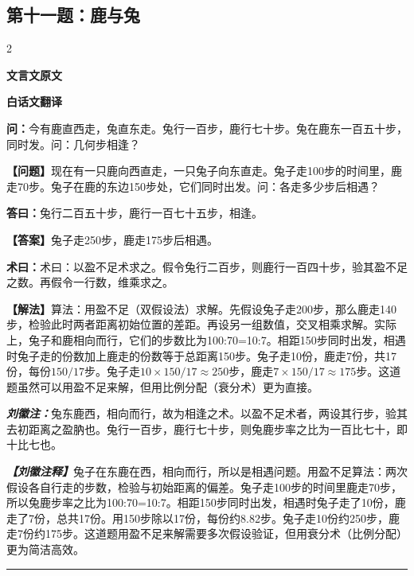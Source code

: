 \documentclass[10pt,a4paper]{article}
\newcommand{\wen}[1]{\textbf{\color{problemcolor}问：}#1\par}
\newcommand{\da}[1]{\textbf{答曰：}#1\par}
\newcommand{\shu}[1]{\textbf{术曰：}#1\par}
\newcommand{\liuhui}[1]{{\color{commentarycolor}\textit{\textbf{刘徽注：}}#1\par}}
\newcommand{\classicalheader}[1]{{\centering\large\bfseries\color{classicalcolor} #1\par\vspace{0.5em}}}
\newcommand{\wenmodern}[1]{\textbf{\color{moderncolor}【问题】}#1\par}
\newcommand{\damodern}[1]{\textbf{【答案】}#1\par}
\newcommand{\shumodern}[1]{\textbf{【解法】}#1\par}
\newcommand{\liuhuimodern}[1]{{\color{commentarycolor}\textit{\textbf{【刘徽注释】}}#1\par}}
\newcommand{\modernheader}[1]{{\centering\large\bfseries\color{moderncolor} #1\par\vspace{0.5em}}}
\newcommand{\problemsec}[1]{\subsection*{#1}}
\begin{document}
\problemsec{第十一题：鹿与兔}
\begin{paracol}{2}
\classicalheader{文言文原文}
\switchcolumn
\modernheader{白话文翻译}
\switchcolumn*

\wen{今有鹿直西走，兔直东走。兔行一百步，鹿行七十步。兔在鹿东一百五十步，同时发。问：几何步相逢？}

\switchcolumn

\wenmodern{现在有一只鹿向西直走，一只兔子向东直走。兔子走100步的时间里，鹿走70步。兔子在鹿的东边150步处，它们同时出发。问：各走多少步后相遇？}

\switchcolumn*

\da{兔行二百五十步，鹿行一百七十五步，相逢。}

\switchcolumn

\damodern{兔子走250步，鹿走175步后相遇。}

\switchcolumn*

\shu{术曰：以盈不足术求之。假令兔行二百步，则鹿行一百四十步，验其盈不足之数。再假令一行数，维乘求之。}

\switchcolumn

\shumodern{算法：用盈不足（双假设法）求解。先假设兔子走200步，那么鹿走140步，检验此时两者距离初始位置的差距。再设另一组数值，交叉相乘求解。实际上，兔子和鹿相向而行，它们的步数比为100:70=10:7。相距150步同时出发，相遇时兔子走的份数加上鹿走的份数等于总距离150步。兔子走10份，鹿走7份，共17份，每份$150/17$步。兔子走$10\times150/17\approx250$步，鹿走$7\times150/17\approx175$步。这道题虽然可以用盈不足来解，但用比例分配（衰分术）更为直接。}

\switchcolumn*

\liuhui{兔东鹿西，相向而行，故为相逢之术。以盈不足术者，两设其行步，验其去初距离之盈肭也。兔行一百步，鹿行七十步，则兔鹿步率之比为一百比七十，即十比七也。}

\switchcolumn

\liuhuimodern{兔子在东鹿在西，相向而行，所以是相遇问题。用盈不足算法：两次假设各自行走的步数，检验与初始距离的偏差。兔子走100步的时间里鹿走70步，所以兔鹿步率之比为100:70=10:7。相距150步同时出发，相遇时兔子走了10份，鹿走了7份，总共17份。用150步除以17份，每份约8.82步。兔子走10份约250步，鹿走7份约175步。这道题用盈不足来解需要多次假设验证，但用衰分术（比例分配）更为简洁高效。}

\end{paracol}

\vspace{0.3cm}
\hrule
\vspace{0.3cm}
\end{document}
